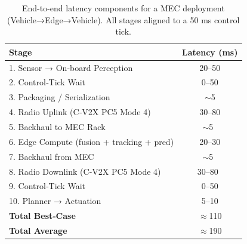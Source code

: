 
\begin{table}[t]
\footnotesize
\centering
\caption{End-to-end latency components for a MEC deployment (Vehicle→Edge→Vehicle). All stages aligned to a 50 ms control tick.}
\label{tab:latency_mec}
\begin{tabularx}{\columnwidth}{@{}X c@{}}
\toprule
\textbf{Stage} & \textbf{Latency (ms)} \\
\midrule
1. Sensor → On‐board Perception & 20–50 \\
2. Control‐Tick Wait & 0–50 \\
3. Packaging / Serialization & $\sim$5 \\
4. Radio Uplink (C‐V2X PC5 Mode 4)~\cite{Jeon2018ReselectionLookahead} & 30–80 \\
5. Backhaul to MEC Rack~\cite{MECLatency} & $\sim$5~\cite{MECLatency} \\
6. Edge Compute (fusion + tracking + pred) & 20–30 \\
7. Backhaul from MEC~\cite{MECLatency} & $\sim$5~\cite{MECLatency} \\
8. Radio Downlink (C‐V2X PC5 Mode 4)~\cite{Jeon2018ReselectionLookahead} & 30–80~\cite{Jeon2018ReselectionLookahead} \\
9. Control‐Tick Wait & 0–50 \\
10. Planner → Actuation & 5–10 \\
\midrule
\textbf{Total Best‐Case} & $\approx$110 \\
\textbf{Total Average} & $\approx$190 \\
\bottomrule
\end{tabularx}
\vspace{3mm}
\end{table}
